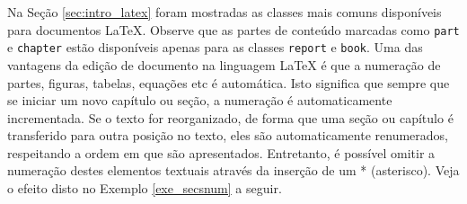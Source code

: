 Na Seção \ref{sec:intro_latex} foram mostradas as classes mais comuns disponíveis para documentos \LaTeX{}. Observe que as partes de conteúdo marcadas como \texttt{part} e \texttt{chapter} estão disponíveis apenas para as classes \texttt{report} e \texttt{book}. Uma das vantagens da edição de documento na linguagem \LaTeX{} é que a numeração de partes, figuras, tabelas, equações etc é automática. Isto significa que sempre que se iniciar um novo capítulo ou seção, a numeração é automaticamente incrementada. Se o texto for reorganizado, de forma que uma seção ou capítulo é transferido para outra posição no texto, eles são automaticamente renumerados, respeitando a ordem em que são apresentados. Entretanto, é possível omitir a numeração destes elementos textuais através da inserção de um * (asterisco). Veja o efeito disto no Exemplo \ref{exe_secsnum} a seguir.



